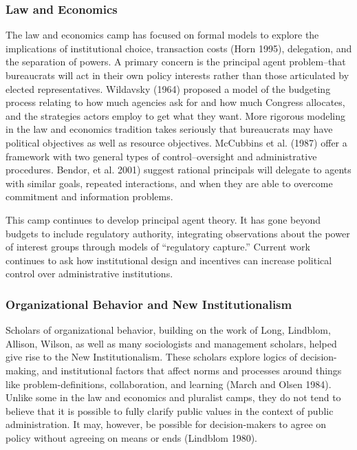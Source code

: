 \subsubsection{Law and Economics}

The law and economics camp has focused on formal models to explore the implications of institutional choice, transaction costs (Horn 1995), delegation, and the separation of powers. A primary concern is the principal agent problem--that bureaucrats will act in their own policy interests rather than those articulated by elected representatives. Wildavsky (1964) proposed a model of the budgeting process relating to how much agencies ask for and how much Congress allocates, and the strategies actors employ to get what they want. More rigorous modeling in the law and economics tradition takes seriously that bureaucrats may have political objectives as well as resource objectives. McCubbins et al. (1987) offer a framework with two general types of control--oversight and administrative procedures. Bendor, et al. 2001) suggest rational principals will delegate to agents with similar goals, repeated interactions, and when they are able to overcome commitment and information problems.

This camp continues to develop principal agent theory. It has gone beyond budgets to include regulatory authority, integrating observations about the power of interest groups through models of ``regulatory capture.'' Current work continues to ask how institutional design and incentives can increase political control over administrative institutions. 

\subsubsection{Organizational Behavior and New Institutionalism}

Scholars of organizational behavior, building on the work of Long, Lindblom, Allison, Wilson, as well as many sociologists and management scholars, helped give rise to the New Institutionalism. These scholars explore logics of decision-making, and institutional factors that affect norms and processes around things like problem-definitions, collaboration, and learning (March and Olsen 1984). Unlike some in the law and economics and pluralist camps, they do not tend to believe that it is possible to fully clarify public values in the context of public administration. It may, however, be possible for decision-makers to agree on policy without agreeing on means or ends (Lindblom 1980).

